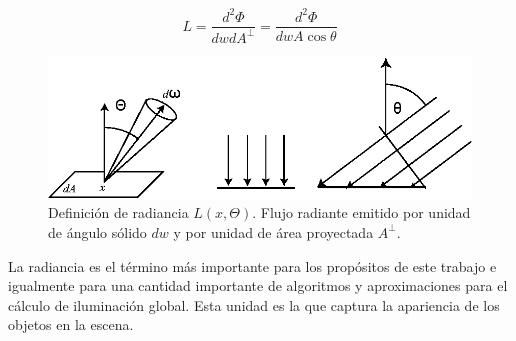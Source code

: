 \begin{equation}
    L = \frac{d^2\Phi}{dwdA^\bot} = \frac{d^2\Phi}{dwA\cos\theta}
	\label{eq:radiance_eq}
\end{equation}

\begin{figure}[H]
	\centering
	\includegraphics[width=0.85\linewidth]{media/radiance.eps}
	\caption{Definición de radiancia $L(x,\Theta)$. Flujo radiante emitido por unidad de ángulo sólido $dw$ y por unidad de área proyectada $A^\bot$.}
	\label{fig:radiance_fi}
\end{figure}

La radiancia es el término más importante para los propósitos de este trabajo e igualmente para una cantidad importante de algoritmos y aproximaciones para el cálculo de iluminación global. Esta unidad es la que captura la apariencia de los objetos en la escena.
